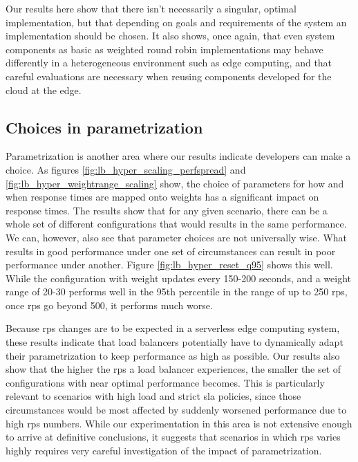 \documentclass[draft,final]{vutinfth} %
\providecommand{\DIFdelbegin}{} %
\providecommand{\DIFdelend}{} %
\begin{document}
Our results here show that there isn't necessarily a singular, optimal implementation, but that depending on goals and requirements of the system an implementation should be chosen.
It also shows, once again, that even system components as basic as weighted round robin implementations may behave differently in a heterogeneous environment such as edge computing, and that careful evaluations are necessary when reusing components developed for the cloud at the edge.

\subsection{Choices in parametrization}
Parametrization is another area where our results indicate developers can make a choice.
As figures \ref{fig:lb_hyper_scaling_perfspread} and \ref{fig:lb_hyper_weightrange_scaling} show, the choice of parameters for how and when response times are mapped onto weights has a significant impact on response times.
The results show that for any given scenario, there can be a whole set of different configurations that would results in the same performance.
We can, however, also see that parameter choices are not universally wise.
What results in good performance under one set of circumstances can result in poor performance under another.
Figure \ref{fig:lb_hyper_reset_q95} shows this well.
While the configuration with weight updates every 150-200 seconds, and a weight range of 20-30 performs well in the 95th percentile in the range of up to 250 \gls{rps}, once \gls{rps} go beyond 500, it performs much worse.

Because \gls{rps} changes are to be expected in a serverless edge computing system, these results indicate that load balancers potentially have to dynamically adapt their parametrization to keep performance as high as possible.
Our results also show that the higher the \gls{rps} a load balancer experiences, the smaller the set of configurations with near optimal performance becomes.
This is particularly relevant to scenarios with high load and strict \gls{sla} policies, since those circumstances would be most affected by suddenly worsened performance due to high \gls{rps} numbers.
While our experimentation in this area is not extensive enough to arrive at definitive conclusions, it suggests that scenarios in which \gls{rps} varies highly requires very careful investigation of the impact of parametrization.


 \DIFdelbegin %
\DIFdelend %
\end{document}
